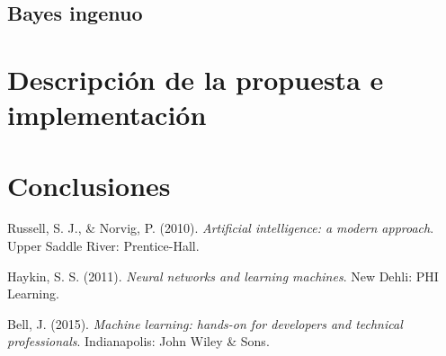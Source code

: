 \documentclass[spanish,11pt,letterpaper]{article}
\begin{document}
\subsection{Bayes ingenuo}

\section{Descripción de la propuesta e implementación}

\section{Conclusiones}

\begin{thebibliography}{9}
Russell, S. J., \& Norvig, P. (2010).
\textit{Artificial intelligence: a modern approach}.
Upper Saddle River: Prentice-Hall.

Haykin, S. S. (2011).
\textit{Neural networks and learning machines}.
New Dehli: PHI Learning.

Bell, J. (2015).
\textit{Machine learning: hands-on for developers and technical professionals}.
Indianapolis: John Wiley \& Sons.
\end{thebibliography}
\end{document}
